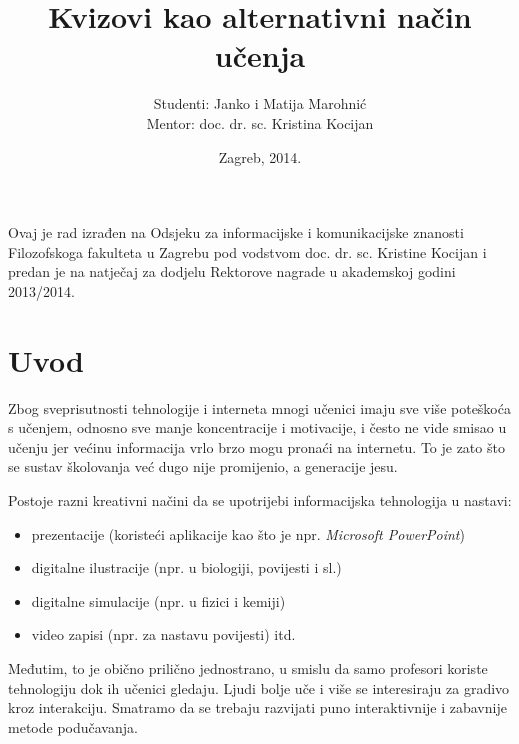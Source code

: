\documentclass[11pt]{scrreprt}
\begin{document}
\titlehead{}
\title{Kvizovi kao alternativni način učenja}
\vfill
\author{Studenti: Janko i Matija Marohnić\\Mentor: doc. dr. sc. Kristina
Kocijan}
\date{Zagreb, 2014.}

\maketitle

\pagebreak

Ovaj je rad izrađen na Odsjeku za informacijske i komunikacijske znanosti
Filozofskoga fakulteta u Zagrebu pod vodstvom doc. dr. sc. Kristine Kocijan i
predan je na natječaj za dodjelu Rektorove nagrade u akademskoj godini
2013/2014.

\pagebreak

\tableofcontents

\chapter{Uvod}

Zbog sveprisutnosti tehnologije i interneta mnogi učenici imaju sve više
poteškoća s učenjem, odnosno sve manje koncentracije i motivacije, i često ne
vide smisao u učenju jer većinu informacija vrlo brzo mogu pronaći na internetu.
To je zato što se sustav školovanja već dugo nije promijenio, a generacije
jesu.\cite{perisic13}

Postoje razni kreativni načini da se upotrijebi informacijska tehnologija u
nastavi:

\begin{itemize}
  \item prezentacije (koristeći aplikacije kao što je npr. \emph{Microsoft
    PowerPoint})
  \item digitalne ilustracije (npr. u biologiji, povijesti i sl.)
  \item digitalne simulacije (npr. u fizici i kemiji)
  \item video zapisi (npr. za nastavu povijesti) itd.
\end{itemize}

Međutim, to je obično prilično jednostrano, u smislu da samo profesori koriste
tehnologiju dok ih učenici gledaju. Ljudi bolje uče i više se interesiraju za
gradivo kroz interakciju. Smatramo da se trebaju razvijati puno interaktivnije i
zabavnije metode podučavanja.
\end{document}
